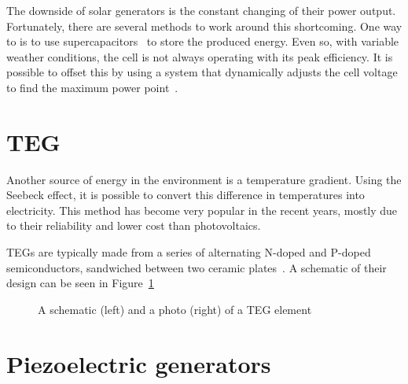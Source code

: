 \documentclass[a4paper,10pt]{article}
\begin{document}
The downside of solar generators is the constant changing of their power output. Fortunately, there are several methods to work around this shortcoming. One way to is to use supercapacitors~\cite{cap-wsn-ieee} to store the produced energy. Even so, with variable weather conditions, the cell is not always operating with its peak efficiency. It is possible to offset this by using a system that dynamically adjusts the cell voltage to find the maximum power point~\cite{solar-mppt-ieee}. 

\section{\acl{TEG}}

Another source of energy in the environment is a temperature gradient. Using the Seebeck effect, it is possible to convert this difference in temperatures into electricity. This method has become very popular in the recent years, mostly due to their reliability and lower cost than photovoltaics. 

\acp{TEG} are typically made from a series of alternating N-doped and P-doped semiconductors, sandwiched between two ceramic plates~\cite{salerno10}. A schematic of their design can be seen in Figure~\ref{fig:teg-schematic}

\begin{figure}[h]
\caption{A schematic (left) and a photo (right) of a \ac{TEG} element~\cite{salerno10,wiki:teg}}
\label{fig:teg-schematic}
\end{figure}


\section{Piezoelectric generators}
\end{document}
